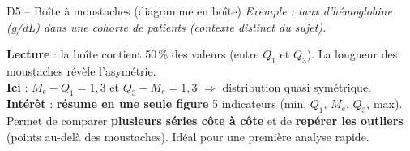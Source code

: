 \documentclass[11pt,a4paper]{article}
\begin{document}
\begin{vignetteCours}{D5 -- Boîte à moustaches (diagramme en boîte)}
\emph{Exemple : taux d'hémoglobine (g/dL) dans une cohorte de patients (contexte distinct du sujet).}
\begin{center}
\end{center}
\textbf{Lecture} : la boîte contient 50\,\% des valeurs (entre $Q_1$ et $Q_3$). La longueur des moustaches révèle l'asymétrie.\\
\textbf{Ici} : $M_e - Q_1 = 1{,}3$ et $Q_3 - M_e = 1{,}3$ $\Rightarrow$ distribution quasi symétrique.\\
\textbf{Intérêt} : \textbf{résume en une seule figure} 5 indicateurs (min, $Q_1$, $M_e$, $Q_3$, max). Permet de comparer \textbf{plusieurs séries côte à côte} et de \textbf{repérer les outliers} (points au-delà des moustaches). Idéal pour une première analyse rapide.
\end{vignetteCours}
\end{document}
